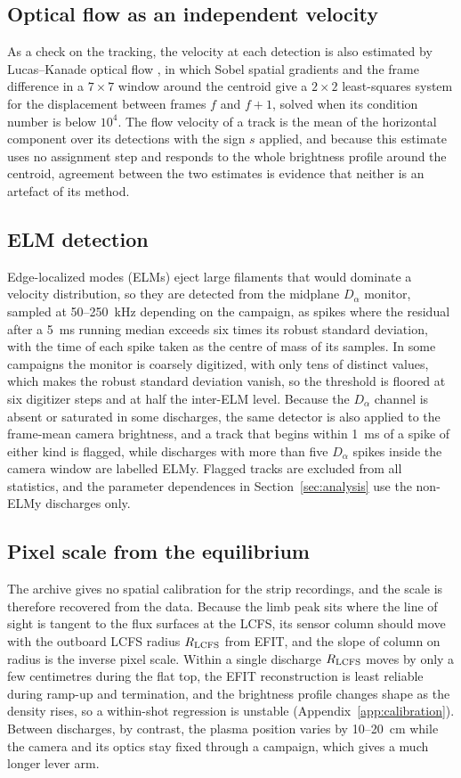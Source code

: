 \subsection{Optical flow as an independent velocity}
As a check on the tracking, the velocity at each detection is also estimated by Lucas--Kanade optical flow \citep{lucas1981iterative}, in which Sobel spatial gradients and the frame difference in a $7 \times 7$ window around the centroid give a $2 \times 2$ least-squares system for the displacement between frames $f$ and $f + 1$, solved when its condition number is below $10^4$. The flow velocity of a track is the mean of the horizontal component over its detections with the sign $s$ applied, and because this estimate uses no assignment step and responds to the whole brightness profile around the centroid, agreement between the two estimates is evidence that neither is an artefact of its method.

\subsection{ELM detection}
Edge-localized modes (ELMs) eject large filaments that would dominate a velocity distribution, so they are detected from the midplane $D_\alpha$ monitor, sampled at 50--250~kHz depending on the campaign, as spikes where the residual after a 5~ms running median exceeds six times its robust standard deviation, with the time of each spike taken as the centre of mass of its samples. In some campaigns the monitor is coarsely digitized, with only tens of distinct values, which makes the robust standard deviation vanish, so the threshold is floored at six digitizer steps and at half the inter-ELM level. Because the $D_\alpha$ channel is absent or saturated in some discharges, the same detector is also applied to the frame-mean camera brightness, and a track that begins within 1~ms of a spike of either kind is flagged, while discharges with more than five $D_\alpha$ spikes inside the camera window are labelled ELMy. Flagged tracks are excluded from all statistics, and the parameter dependences in Section~\ref{sec:analysis} use the non-ELMy discharges only.

\subsection{Pixel scale from the equilibrium}
\label{sec:calibration}
The archive gives no spatial calibration for the strip recordings, and the scale is therefore recovered from the data. Because the limb peak sits where the line of sight is tangent to the flux surfaces at the LCFS, its sensor column should move with the outboard LCFS radius $R_{\rm LCFS}$ from EFIT, and the slope of column on radius is the inverse pixel scale. Within a single discharge $R_{\rm LCFS}$ moves by only a few centimetres during the flat top, the EFIT reconstruction is least reliable during ramp-up and termination, and the brightness profile changes shape as the density rises, so a within-shot regression is unstable (Appendix~\ref{app:calibration}). Between discharges, by contrast, the plasma position varies by 10--20~cm while the camera and its optics stay fixed through a campaign, which gives a much longer lever arm.

